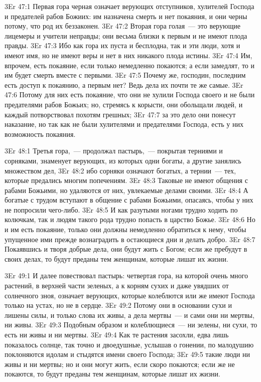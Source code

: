 \vs 3Er 47:1
Первая гора черная
означает верующих отступников, хулителей Господа и предателей рабов Божиих: им
назначена смерть и нет покаяния, и они черны потому, что род их беззаконен.
\vs 3Er 47:2
Вторая гора голая~--- это
верующие лицемеры и учители неправды; они весьма близки к первым и не имеют
плода правды.
\vs 3Er 47:3
Ибо как гора их пуста и
бесплодна, так и эти люди, хотя и имеют имя, но не имеют веры и нет в них
никакого плода истины.
\vs 3Er 47:4
Им, впрочем, есть
покаяние, если только немедленно покаются; а если замедлят, то и им будет
смерть вместе с первыми.
\vs 3Er 47:5
Почему же, господин,
последним есть доступ к покаянию, а первым нет? Ведь дела их почти те же
самые.
\vs 3Er 47:6
Потому для них есть
покаяние, что они не хулили Господа своего и не были предателями рабов Божьих;
но, стремясь к корысти, они обольщали людей, и каждый потворствовал похотям
грешных;
\vs 3Er 47:7
за это дело они понесут
наказание, но так как не были хулителями и предателями Господа, есть у них
возможность покаяния.

\vs 3Er 48:1
Третья гора,~--- продолжал
пастырь,~--- покрытая терниями и сорняками, знаменует верующих, из которых одни
богаты, а другие занялись множеством дел,
\vs 3Er 48:2
ибо сорняки означают
богатых, а тернии~--- тех, которые предались многим попечениям.
\vs 3Er 48:3
Таковые не имеют общения с
рабами Божьими, но удаляются от них, увлекаемые делами своими.
\vs 3Er 48:4
А богатые с трудом
вступают в общение с рабами Божьими, опасаясь, чтобы у них не попросили
чего-либо.
\vs 3Er 48:5
И как разутыми ногами
трудно ходить по колючкам, так и людям такого рода трудно попасть в царство
Божье.
\vs 3Er 48:6
Но и им есть покаяние,
только они должны немедленно обратиться к нему, чтобы упущенное ими прежде
вознаградить в остающиеся дни и делать добро.
\vs 3Er 48:7
Покаявшись и творя добрые
дела, они будут жить с Богом; если же пребудут в своих делах, то будут преданы
тем женщинам, которые лишат их жизни.

\vs 3Er 49:1
И далее повествовал
пастырь: четвертая гора, на которой очень много растений, в верхней части
зеленых, а к корням сухих и даже увядших от солнечного зноя, означает
верующих, которые колеблются или же имеют Господа только на устах, но не в
сердце.
\vs 3Er 49:2
Потому они в основании
сухи и лишены силы, и только слова их живы, а дела мертвы~--- и сами они ни
мертвы, ни живы.
\vs 3Er 49:3
Подобным образом и
колеблющиеся~--- ни зелены, ни сухи, то есть ни живы и ни мертвы.
\vs 3Er 49:4
Как те растения засохли,
едва лишь показалось солнце, так точно и двоедушные, услышав о гонении, по
малодушию поклоняются идолам и стыдятся имени своего Господа;
\vs 3Er 49:5
такие люди ни живы и ни
мертвы; но и они могут жить, если скоро покаются; если же не покаются, то
будут преданы тем женщинам, которые лишат их жизни.

